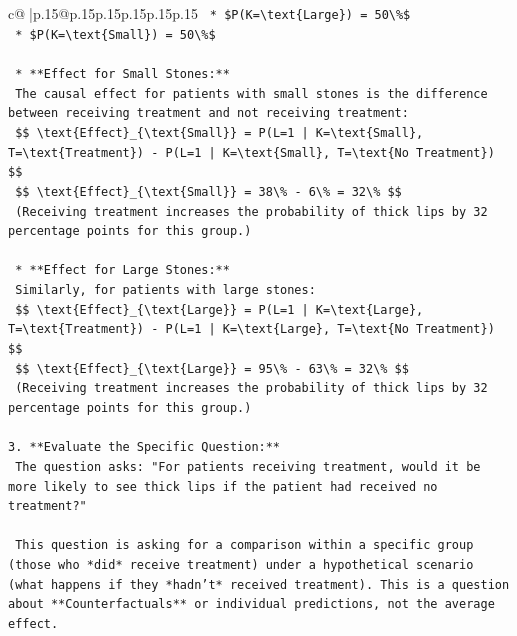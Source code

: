 \documentclass{article}
\begin{document}
{\begin{supertabular}{c@{$\;$}|p{.15\linewidth}@{}p{.15\linewidth}p{.15\linewidth}p{.15\linewidth}p{.15\linewidth}p{.15\linewidth}}
{{{\texttt{    *   \$P(K=\textbackslash{}text\{Large\}) = 50\textbackslash{}\%\$} \\
\texttt{    *   \$P(K=\textbackslash{}text\{Small\}) = 50\textbackslash{}\%\$} \\
\\ 
\texttt{    *   **Effect for Small Stones:**} \\
\texttt{        The causal effect for patients with small stones is the difference between receiving treatment and not receiving treatment:} \\
\texttt{        \$\$ \textbackslash{}text\{Effect\}\_\{\textbackslash{}text\{Small\}\} = P(L=1 | K=\textbackslash{}text\{Small\}, T=\textbackslash{}text\{Treatment\}) {-} P(L=1 | K=\textbackslash{}text\{Small\}, T=\textbackslash{}text\{No Treatment\}) \$\$} \\
\texttt{        \$\$ \textbackslash{}text\{Effect\}\_\{\textbackslash{}text\{Small\}\} = 38\textbackslash{}\% {-} 6\textbackslash{}\% = 32\textbackslash{}\% \$\$} \\
\texttt{        (Receiving treatment increases the probability of thick lips by 32 percentage points for this group.)} \\
\\ 
\texttt{    *   **Effect for Large Stones:**} \\
\texttt{        Similarly, for patients with large stones:} \\
\texttt{        \$\$ \textbackslash{}text\{Effect\}\_\{\textbackslash{}text\{Large\}\} = P(L=1 | K=\textbackslash{}text\{Large\}, T=\textbackslash{}text\{Treatment\}) {-} P(L=1 | K=\textbackslash{}text\{Large\}, T=\textbackslash{}text\{No Treatment\}) \$\$} \\
\texttt{        \$\$ \textbackslash{}text\{Effect\}\_\{\textbackslash{}text\{Large\}\} = 95\textbackslash{}\% {-} 63\textbackslash{}\% = 32\textbackslash{}\% \$\$} \\
\texttt{        (Receiving treatment increases the probability of thick lips by 32 percentage points for this group.)} \\
\\ 
\texttt{3.  **Evaluate the Specific Question:**} \\
\texttt{    The question asks: "For patients receiving treatment, would it be more likely to see thick lips if the patient had received no treatment?"} \\
\\ 
\texttt{    This question is asking for a comparison within a specific group (those who *did* receive treatment) under a hypothetical scenario (what happens if they *hadn't* received treatment). This is a question about **Counterfactuals** or individual predictions, not the average effect.} \\
}}}
\end{supertabular}}
\end{document}
